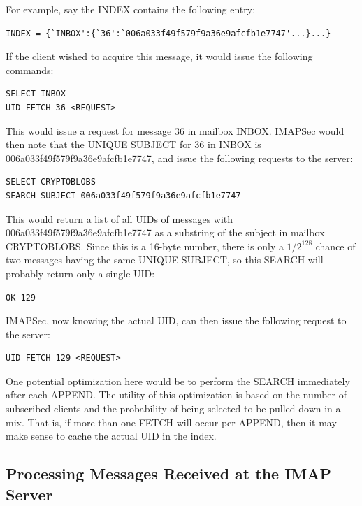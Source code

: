 \documentclass[pageno]{jpaper}
\newcommand{\project}{IMAPSec }
\newcommand{\projectnospace}{IMAPSec}
\begin{document}
For example, say the INDEX contains the following entry:

\begin{lstlisting}
INDEX = {`INBOX':{`36':`006a033f49f579f9a36e9afcfb1e7747'...}...}
\end{lstlisting}

If the client wished to acquire this message, it would issue the following commands:

\begin{lstlisting}
SELECT INBOX
UID FETCH 36 <REQUEST>
\end{lstlisting}

This would issue a request for message 36 in mailbox INBOX. \project would then note that
the UNIQUE SUBJECT for 36 in INBOX is 006a033f49f579f9a36e9afcfb1e7747, and issue the following requests to the server:

\begin{lstlisting}
SELECT CRYPTOBLOBS
SEARCH SUBJECT 006a033f49f579f9a36e9afcfb1e7747
\end{lstlisting}

This would return a list of all UIDs of messages with 006a033f49f579f9a36e9afcfb1e7747 as a substring of the subject in mailbox CRYPTOBLOBS. Since this is a 16-byte number, there is only a $1/2^{128}$ chance of two messages having the same UNIQUE SUBJECT, so this SEARCH will probably return only a single UID:

\begin{lstlisting}
OK 129
\end{lstlisting}


\projectnospace, now knowing the actual UID, can then issue the following request to the server:

\begin{lstlisting}
UID FETCH 129 <REQUEST>
\end{lstlisting}

One potential optimization here would be to perform the SEARCH immediately after each APPEND. The utility of this optimization is based on the number of subscribed clients and the probability of being selected to be pulled down in a mix. That is, if more than one FETCH will occur per APPEND, then it may make sense to cache the actual UID in the index.

\subsection{Processing Messages Received at the IMAP Server}
\label{processing}
\end{document}
